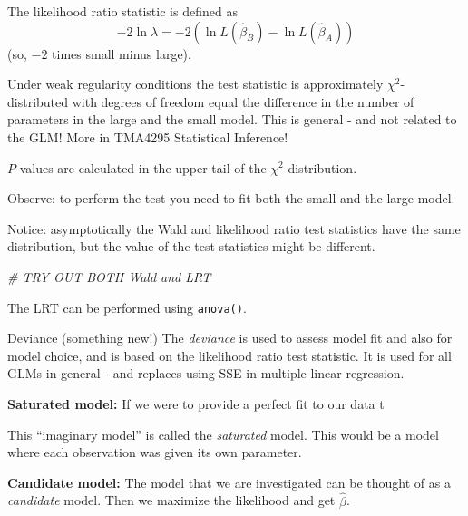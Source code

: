 \documentclass[
  ignorenonframetext,
]{beamer}
\newenvironment{Shaded}{\begin{snugshade}}{\end{snugshade}}
\newcommand{\CommentTok}[1]{\textcolor[rgb]{0.56,0.35,0.01}{\textit{#1}}}
\begin{document}
\begin{frame}
The likelihood ratio statistic is defined as
\[- 2\ln \lambda=-2(\ln L(\hat{\beta}_B)-\ln L(\hat{\beta}_A)) \] (so,
\(-2\) times small minus large).

Under weak regularity conditions the test statistic is approximately
\(\chi^2\)-distributed with degrees of freedom equal the difference in
the number of parameters in the large and the small model. This is
general - and not related to the GLM! More in TMA4295 Statistical
Inference!

\(P\)-values are calculated in the upper tail of the
\(\chi^2\)-distribution.

Observe: to perform the test you need to fit both the small and the
large model.
\end{frame}

\begin{frame}[fragile]
Notice: asymptotically the Wald and likelihood ratio test statistics
have the same distribution, but the value of the test statistics might
be different.

\begin{Shaded}
\begin{Highlighting}[]
\CommentTok{\# TRY OUT BOTH Wald and LRT}
\end{Highlighting}
\end{Shaded}

The LRT can be performed using \texttt{anova()}.
\end{frame}

\begin{frame}
\begin{block}{Deviance (something new!)}
\label{deviance-something-new}
The \emph{deviance} is used to assess model fit and also for model
choice, and is based on the likelihood ratio test statistic. It is used
for all GLMs in general - and replaces using SSE in multiple linear
regression.

\textbf{Saturated model:} If we were to provide a perfect fit to our
data t

This ``imaginary model'' is called the \emph{saturated} model. This
would be a model where each observation was given its own parameter.

\textbf{Candidate model:} The model that we are investigated can be
thought of as a \emph{candidate} model. Then we maximize the likelihood
and get \(\hat{\beta}\).
\end{block}
\end{frame}
\end{document}
